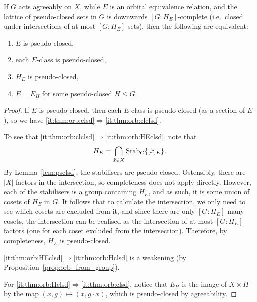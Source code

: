 	\begin{thm}
		\label{thm:orb}
		If $G$ acts agreeably on $X$, while $E$ is an orbital equivalence relation, and the lattice of pseudo-closed sets in $G$ is downwards $[G:H_E]$-complete (i.e.\ closed under intersections of at most $[G:H_E]$ sets), then the following are equivalent:
		\begin{enumerate}
			\item
			\label{it:thm:orb:clsd}
			$E$ is pseudo-closed,
			\item
			\label{it:thm:orb:clclsd}
			each $E$-class is pseudo-closed,
			\item
			\label{it:thm:orb:HEclsd}
			$H_E$ is pseudo-closed,
			\item
			\label{it:thm:orb:Hclsd}
			$E=E_H$ for some pseudo-closed $H\leq G$.
		\end{enumerate}
	\end{thm}
	\begin{proof}
		If $E$ is pseudo-closed, then each $E$-class is pseudo-closed (as a section of $E$), so we have \ref{it:thm:orb:clsd}$\Rightarrow$\ref{it:thm:orb:clclsd}.
		
		To see that \ref{it:thm:orb:clclsd}$\Rightarrow$\ref{it:thm:orb:HEclsd}, note that
		\[
		H_E=\bigcap_{\tilde x\in X}\operatorname{{Stab}}_G\{[\tilde x]_E\}.
		\]
		By Lemma~\ref{lem:psclsd}, the stabilisers are pseudo-closed. Ostensibly, there are $\lvert X\rvert$ factors in the intersection, so completeness does not apply directly. However, each of the stabilisers is a group containing $H_E$, and as such, it is some union of cosets of $H_E$ in $G$. It follows that to calculate the intersection, we only need to see which cosets are excluded from it, and since there are only $[G:H_E]$ many cosets, the intersection can be realised as the intersection of at most $[G:H_E]$ factors (one for each coset excluded from the intersection). Therefore, by completeness, $H_E$ is pseudo-closed.
		
		\ref{it:thm:orb:HEclsd}$\Rightarrow$\ref{it:thm:orb:Hclsd} is a weakening (by Proposition~\ref{prop:orb_from_group}).
		
		For \ref{it:thm:orb:Hclsd}$\Rightarrow$\ref{it:thm:orb:clsd}, notice that $E_H$ is the image of $X\times H$ by the map $(x,g)\mapsto (x,g\cdot x)$, which is pseudo-closed by agreeability.
	\end{proof}
	

